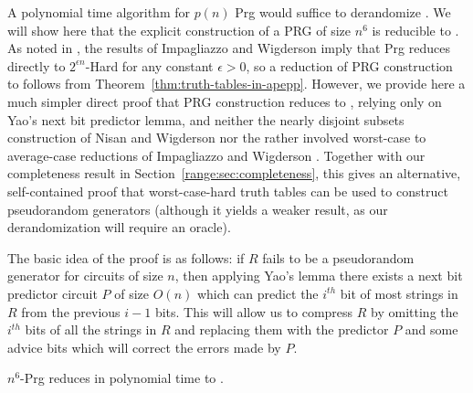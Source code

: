 A polynomial time algorithm for {\sc $p(n)$ Prg} would suffice to derandomize  \cite{NW}. We will show here that the explicit construction of a PRG of size $n^6$ is reducible to \avoid.
As noted in , the results of Impagliazzo and Wigderson \cite{IW} imply that {\sc Prg} reduces directly to {\sc $2^{\epsilon n}$-Hard} for any constant $\epsilon > 0$, so a reduction of PRG construction to \avoid follows from Theorem~\ref{thm:truth-tables-in-apepp}. However, we provide here a much simpler direct proof that PRG construction reduces to \avoid, relying only on Yao's next bit predictor lemma, and neither the nearly disjoint subsets construction of Nisan and Wigderson \cite{NW} nor the rather involved worst-case to average-case reductions of Impagliazzo and Wigderson \cite{IW}. Together with our completeness result in Section~\ref{range:sec:completeness}, this gives an alternative, self-contained proof that worst-case-hard truth tables can be used to construct pseudorandom generators (although it yields a weaker result, as our derandomization will require an  oracle).

The basic idea of the proof is as follows: if $R$ fails to be a pseudorandom generator for circuits of size $n$, then applying Yao's lemma there exists a next bit predictor circuit $P$ of size $O(n)$ which can predict the $i^{th}$ bit of most strings in $R$ from the previous $i-1$ bits. This will allow us to compress $R$ by omitting the $i^{th}$ bits of all the strings in $R$ and replacing them with the predictor $P$ and some advice bits which will correct the errors made by $P$.

\begin{theorem}\label{thm:prg}
{\sc $n^6$-Prg} reduces in polynomial time to \avoid.
\end{theorem}

